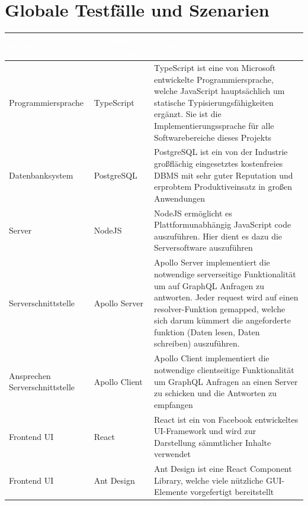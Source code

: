 \documentclass[a4paper,12pt]{article}
\begin{document}
\section{Globale Testfälle und Szenarien}
\begin{center}
      \begin{tabular}{|m{3.5cm}|m{3cm}|m{9cm}|}
            \hline
        \rowcolor{TUMBlue} \textcolor{white}{\textbf{Funktion/Gebiet}} & \textcolor{white}{\textbf{Eingesetzte Technologie}} & \textcolor{white}{\textbf{Erläuterung}} \\
        \hline
        Programmiersprache & TypeScript & TypeScript ist eine von Microsoft entwickelte Programmiersprache, welche JavaScript hauptsächlich um statische Typisierungsfähigkeiten ergänzt. Sie ist die Implementierungssprache für alle Softwarebereiche dieses Projekts \\
        \hline
        Datenbanksystem & PostgreSQL & PostgreSQL ist ein von der Industrie großflächig eingesetztes kostenfreies DBMS mit sehr guter Reputation und erprobtem Produktiveinsatz in großen Anwendungen \\
        \hline
        Server & NodeJS & NodeJS ermöglicht es Plattformunabhängig JavaScript code auszuführen. Hier dient es dazu die Serversoftware auszuführen \\
        \hline
        Serverschnittstelle & Apollo Server & Apollo Server implementiert die notwendige serverseitige Funktionalität um auf GraphQL Anfragen zu antworten. Jeder request wird auf einen resolver-Funktion gemapped, welche sich darum kümmert die angeforderte funktion (Daten lesen, Daten schreiben) auszuführen. \\
        \hline
        Ansprechen Serverschnittstelle & Apollo Client & Apollo Client implementiert die notwendige clientseitige Funktionalität um GraphQL Anfragen an einen Server zu schicken und die Antworten zu empfangen \\
        \hline
        Frontend UI & React & React ist ein von Facebook entwickeltes UI-Framework und wird zur Darstellung sämmtlicher Inhalte verwendet \\
        \hline
        Frontend UI & Ant Design & Ant Design ist eine React Component Library, welche viele nützliche GUI-Elemente vorgefertigt bereitstellt \\
        \hline
      \end{tabular}
\end{center}

\clearpage

\end{document}
